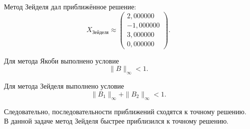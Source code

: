 Метод Зейделя дал приближённое решение:
\[
X_{\text{Зейделя}}
\approx
\begin{pmatrix}
2{,}000000\\
-1{,}000000\\
3{,}000000\\
0{,}000000
\end{pmatrix}.
\]

Для метода Якоби выполнено условие
\[
\|B\|_{\infty}<1.
\]

Для метода Зейделя выполнено условие
\[
\|B_1\|_{\infty}+\|B_2\|_{\infty}<1.
\]

Следовательно, последовательности приближений сходятся к точному решению. В данной задаче метод Зейделя быстрее приблизился к точному решению.
